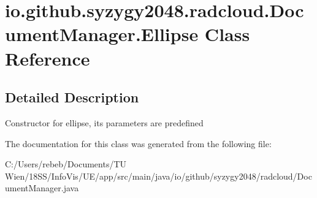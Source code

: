 \hypertarget{classio_1_1github_1_1syzygy2048_1_1radcloud_1_1_document_manager_1_1_ellipse}{}\section{io.\+github.\+syzygy2048.\+radcloud.\+Document\+Manager.\+Ellipse Class Reference}
\label{classio_1_1github_1_1syzygy2048_1_1radcloud_1_1_document_manager_1_1_ellipse}


\subsection{Detailed Description}
Constructor for ellipse, its parameters are predefined 

The documentation for this class was generated from the following file\+:\begin{DoxyCompactItemize}
\item 
C\+:/\+Users/rebeb/\+Documents/\+T\+U Wien/18\+S\+S/\+Info\+Vis/\+U\+E/app/src/main/java/io/github/syzygy2048/radcloud/Document\+Manager.\+java\end{DoxyCompactItemize}
